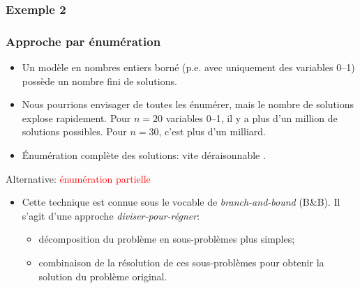 \documentclass[usepdftitle=false]{beamer}
\begin{document}
\begin{frame}
\frametitle{Exemple 2}

\begin{center}
\end{center}

\end{frame}

\begin{frame}
\frametitle{Approche par énumération}

\begin{itemize}
	\item 
Un modèle en nombres entiers borné (p.e. avec uniquement des variables 0--1) possède un nombre fini de solutions.
	\item 
Nous pourrions envisager de toutes les énumérer, mais le nombre de solutions explose rapidement. Pour $n = 20$ variables 0--1, il y a plus d'un million de solutions possibles.
Pour $n=30$, c'est plus d'un milliard.
	\item 
Énumération complète des solutions: vite déraisonnable .
\end{itemize}

Alternative: \textcolor{red}{énumération partielle}
\begin{itemize}
	\item 
Cette technique est connue sous le vocable de {\sl branch-and-bound} (B\&B).
Il s'agit d'une approche {\sl diviser-pour-régner}:
\begin{itemize}
\item
décomposition du problème en sous-problèmes plus simples;
\item
combinaison de la résolution de ces sous-problèmes pour obtenir la solution du problème original.
\end{itemize}
\end{itemize}

\end{frame}
\end{document}
